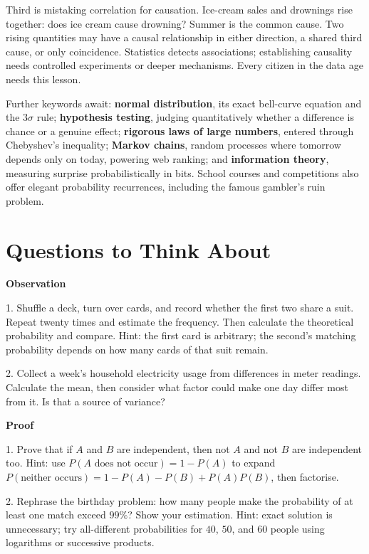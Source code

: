 Third is mistaking correlation for causation. Ice-cream sales and drownings rise together: does ice cream cause drowning? Summer is the common cause. Two rising quantities may have a causal relationship in either direction, a shared third cause, or only coincidence. Statistics detects associations; establishing causality needs controlled experiments or deeper mechanisms. Every citizen in the data age needs this lesson.

\begin{pandeng}
Further keywords await: \textbf{normal distribution}, its exact bell-curve equation and the $3\sigma$ rule; \textbf{hypothesis testing}, judging quantitatively whether a difference is chance or a genuine effect; \textbf{rigorous laws of large numbers}, entered through Chebyshev's inequality; \textbf{Markov chains}, random processes where tomorrow depends only on today, powering web ranking; and \textbf{information theory}, measuring surprise probabilistically in bits. School courses and competitions also offer elegant probability recurrences, including the famous gambler's ruin problem.
\end{pandeng}

\section*{Questions to Think About}

\textbf{Observation}

1. Shuffle a deck, turn over cards, and record whether the first two share a suit. Repeat twenty times and estimate the frequency. Then calculate the theoretical probability and compare. Hint: the first card is arbitrary; the second's matching probability depends on how many cards of that suit remain.

2. Collect a week's household electricity usage from differences in meter readings. Calculate the mean, then consider what factor could make one day differ most from it. Is that a source of variance?

\textbf{Proof}

1. Prove that if $A$ and $B$ are independent, then not $A$ and not $B$ are independent too. Hint: use $P(A\text{ does not occur})=1-P(A)$ to expand $P(\text{neither occurs})=1-P(A)-P(B)+P(A)P(B)$, then factorise.

2. Rephrase the birthday problem: how many people make the probability of at least one match exceed $99\%$? Show your estimation. Hint: exact solution is unnecessary; try all-different probabilities for $40$, $50$, and $60$ people using logarithms or successive products.

